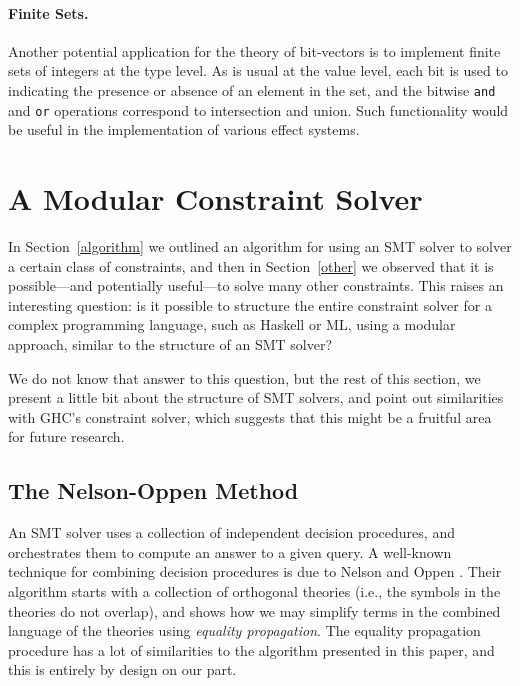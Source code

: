 \documentclass{sigplanconf}
\begin{document}
\paragraph{Finite Sets.}
Another potential application for the theory of bit-vectors is
to implement finite sets of integers at the type level.
As is usual at the value level, each bit is used to indicating the presence
or absence of an element in the set, and the bitwise \Verb"and"
and \Verb"or" operations correspond to intersection and union.
Such functionality would be useful in the implementation of various effect
systems.





\section{A Modular Constraint Solver}
\label{modular-typechecker}

In Section~\ref{algorithm} we outlined an algorithm for using an SMT solver
to solver a certain class of constraints, and then
in Section~\ref{other} we observed that it is possible---and potentially
useful---to solve many other constraints.  This raises an interesting
question: is it possible to structure the entire constraint solver for
a complex programming language, such as Haskell or ML, using a modular
approach, similar to the structure of an SMT solver?

We do not know that answer to this question, but the rest of this section,
we present a little bit about the structure of SMT solvers, and point out
similarities with GHC's constraint solver, which suggests that this might
be a fruitful area for future research.

\subsection{The Nelson-Oppen Method}

An SMT solver uses a collection of independent decision procedures,
and orchestrates them to compute an answer to a given query.  A well-known
technique for combining decision procedures is due to Nelson and Oppen
\cite{NelsonOppen}.  Their algorithm starts with a collection of
orthogonal theories (i.e., the symbols in the theories do not overlap),
and shows how we may simplify terms in the combined language of the
theories using {\em equality propagation}.  The equality propagation procedure
has a lot of similarities to the algorithm presented in this paper,
and this is entirely by design on our part.
\end{document}
